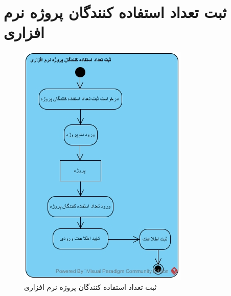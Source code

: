 \section{ثبت تعداد استفاده کنندگان پروژه نرم افزاری}
\begin{figure}[H]
	\centering
	\includegraphics[scale=0.8]{img/activity/numusers}
	\caption{ثبت تعداد استفاده کنندگان پروژه نرم افزاری}
\end{figure}


